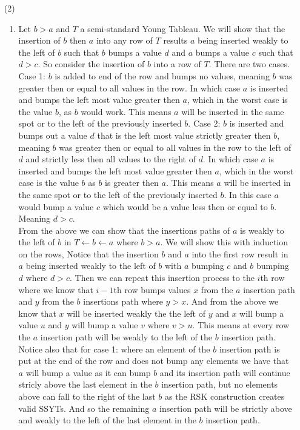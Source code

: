 \documentclass[12pt]{amsart}
\theoremstyle{definition}
\begin{document}
\begin{itemize}
\item[(2)]
\begin{enumerate}[label=(\alph*)]
    \item %
    Let $b>a$ and $T$ a semi-standard Young Tableau. We will show that the insertion of $b$ then $a$ into any row of $T$ results $a$ being inserted weakly to the left of $b$ such that $b$ bumps a value $d$ and $a$ bumps a value $c$ such that $d>c$. So consider the insertion of $b$ into a row of $T$. There are two cases. Case 1: $b$ is added to end of the row and bumps no values, meaning $b$ was greater then or equal to all values in the row. In which case $a$ is inserted and bumps the left most value greater then $a$, which in the worst case is the value $b$, as $b$ would work. This means $a$ will be inserted in the same spot or to the left of the previously inserted $b$. Case 2: $b$ is inserted and bumps out a value $d$ that is the left most value strictly greater then $b$, meaning $b$ was greater then or equal to all values in the row to the left of $d$ and strictly less then all values to the right of $d$. In which case $a$ is inserted and bumps the left most value greater then $a$, which in the worst case is the value $b$ as $b$ is greater then $a$. This means $a$ will be inserted in the same spot or to the left of the previously inserted $b$. In this case $a$ would bump a value $c$ which would be a value less then or equal to $b$. Meaning $d>c$.\\

    From the above we can show that the insertions paths of $a$ is weakly to the left of $b$ in $T\leftarrow b\leftarrow a$ where $b>a$. We will show this with induction on the rows, Notice that the insertion $b$ and $a$ into the first row result in $a$ being inserted weakly to the left of $b$ with $a$ bumping $c$ and $b$ bumping $d$ where $d>c$. Then we can repeat this insertion process to the $i$th row where we know that $i-1$th row bumps values $x$ from the $a$ insertion path and $y$ from the $b$ insertions path where $y>x$. And from the above we know that $x$ will be inserted weakly the the left of $y$ and $x$ will bump a value $u$ and $y$ will bump a value $v$ where $v>u$. This means at every row the $a$ insertion path will be weakly to the left of the $b$ insertion path. Notice also that for case 1: where an element of the $b$ insertion path is put at the end of the row and does not bump any elements we have that $a$ will bump a value as it can bump $b$ and its insertion path will continue stricly above the last element in the $b$ insertion path, but no elements above can fall to the right of the last $b$ as the RSK construction creates valid SSYTs. And so the remaining $a$ insertion path will be strictly above and weakly to the left of the last element in the $b$ insertion path.\\


\end{enumerate}
\end{itemize}
\end{document}
